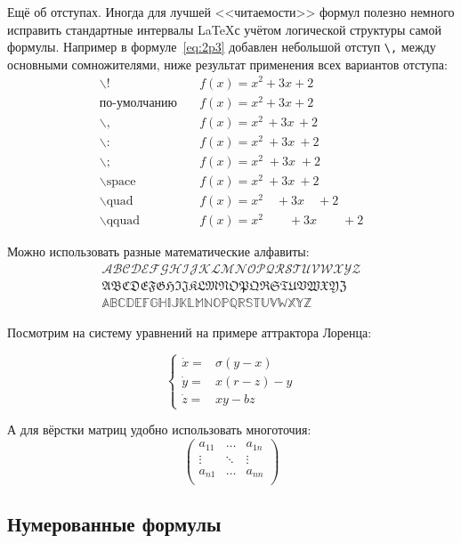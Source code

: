 Ещё об отступах. Иногда для лучшей <<читаемости>> формул полезно
немного исправить стандартные интервалы \LaTeX с учётом логической
структуры самой формулы. Например в формуле~\ref{eq:2p3} добавлен
небольшой отступ \verb+\,+ между основными сомножителями, ниже
результат применения всех вариантов отступа:
\begin{align*}
	\backslash! &\quad f(x) = x^2\! +3x\! +2 \\
	\mbox{по-умолчанию} &\quad f(x) = x^2+3x+2 \\
	\backslash, &\quad f(x) = x^2\, +3x\, +2 \\
	\backslash{:} &\quad f(x) = x^2\: +3x\: +2 \\
	\backslash; &\quad f(x) = x^2\; +3x\; +2 \\
	\backslash \mbox{space} &\quad f(x) = x^2\ +3x\ +2 \\
	\backslash \mbox{quad} &\quad f(x) = x^2\quad +3x\quad +2 \\
	\backslash \mbox{qquad} &\quad f(x) = x^2\qquad +3x\qquad +2
\end{align*}


Можно использовать разные математические алфавиты:
\begin{align}
	\mathcal{ABCDEFGHIJKLMNOPQRSTUVWXYZ} \nonumber \\
	\mathfrak{ABCDEFGHIJKLMNOPQRSTUVWXYZ} \nonumber \\
	\mathbb{ABCDEFGHIJKLMNOPQRSTUVWXYZ} \nonumber
\end{align}

Посмотрим на систему уравнений на примере аттрактора Лоренца:

\[ 
\left\{
\begin{array}{rl}
\dot x = & \sigma (y-x) \\
\dot y = & x (r - z) - y \\
\dot z = & xy - bz
\end{array}
\right.
\]

А для вёрстки матриц удобно использовать многоточия:
\[ 
\left(
\begin{array}{ccc}
a_{11} & \ldots & a_{1n} \\
\vdots & \ddots & \vdots \\
a_{n1} & \ldots & a_{nn} \\
\end{array}
\right)
\]


\subsection{Нумерованные формулы} \label{subsect1_3_3}

